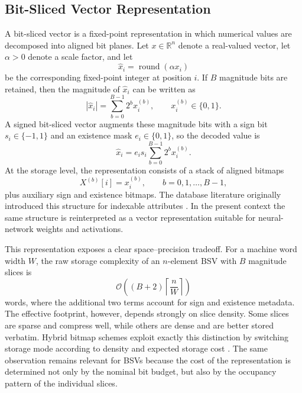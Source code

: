 \subsection{Bit-Sliced Vector Representation}
A bit-sliced vector is a fixed-point representation in which numerical values are decomposed into aligned bit planes. Let $x \in \mathbb{R}^{n}$ denote a real-valued vector, let $\alpha > 0$ denote a scale factor, and let
\begin{equation}
    \hat{x}_i = \operatorname{round}(\alpha x_i)
\end{equation}
be the corresponding fixed-point integer at position $i$. If $B$ magnitude bits are retained, then the magnitude of $\hat{x}_i$ can be written as
\begin{equation}
    |\hat{x}_i| = \sum_{b=0}^{B-1} 2^b x_i^{(b)}, \qquad x_i^{(b)} \in \{0,1\}.
\end{equation}
A signed bit-sliced vector augments these magnitude bits with a sign bit $s_i \in \{-1,1\}$ and an existence mask $e_i \in \{0,1\}$, so the decoded value is
\begin{equation}
    \hat{x}_i = e_i s_i \sum_{b=0}^{B-1} 2^b x_i^{(b)}.
\end{equation}
At the storage level, the representation consists of a stack of aligned bitmaps
\begin{equation}
    X^{(b)}[i] = x_i^{(b)}, \qquad b = 0,1,\ldots,B-1,
\end{equation}
plus auxiliary sign and existence bitmaps. The database literature originally introduced this structure for indexable attributes \cite{oneil1997variant,rinfret2001bsi}. In the present context the same structure is reinterpreted as a vector representation suitable for neural-network weights and activations.

This representation exposes a clear space--precision tradeoff. For a machine word width $W$, the raw storage complexity of an $n$-element BSV with $B$ magnitude slices is
\begin{equation}
    \mathcal{O}\!\left((B+2)\left\lceil \frac{n}{W} \right\rceil\right)
\end{equation}
words, where the additional two terms account for sign and existence metadata. The effective footprint, however, depends strongly on slice density. Some slices are sparse and compress well, while others are dense and are better stored verbatim. Hybrid bitmap schemes exploit exactly this distinction by switching storage mode according to density and expected storage cost \cite{hybridbitmap}. The same observation remains relevant for BSVs because the cost of the representation is determined not only by the nominal bit budget, but also by the occupancy pattern of the individual slices.

